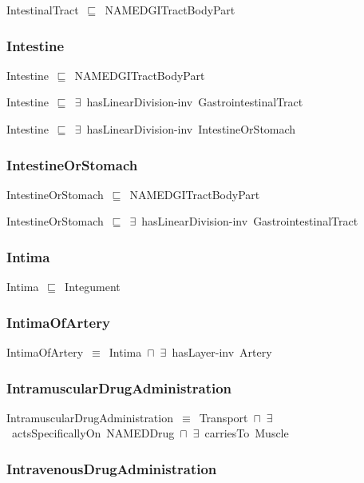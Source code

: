 \documentclass{article}
\begin{document}
IntestinalTract~\ensuremath{\sqsubseteq}~NAMEDGITractBodyPart~

\subsubsection*{Intestine}

Intestine~\ensuremath{\sqsubseteq}~NAMEDGITractBodyPart~

Intestine~\ensuremath{\sqsubseteq}~\ensuremath{\exists}~hasLinearDivision-inv~GastrointestinalTract~

Intestine~\ensuremath{\sqsubseteq}~\ensuremath{\exists}~hasLinearDivision-inv~IntestineOrStomach~

\subsubsection*{IntestineOrStomach}

IntestineOrStomach~\ensuremath{\sqsubseteq}~NAMEDGITractBodyPart~

IntestineOrStomach~\ensuremath{\sqsubseteq}~\ensuremath{\exists}~hasLinearDivision-inv~GastrointestinalTract~

\subsubsection*{Intima}

Intima~\ensuremath{\sqsubseteq}~Integument~

\subsubsection*{IntimaOfArtery}

IntimaOfArtery~\ensuremath{\equiv}~Intima~\ensuremath{\sqcap}~\ensuremath{\exists}~hasLayer-inv~Artery

\subsubsection*{IntramuscularDrugAdministration}

IntramuscularDrugAdministration~\ensuremath{\equiv}~Transport~\ensuremath{\sqcap}~\ensuremath{\exists}~actsSpecificallyOn~NAMEDDrug~\ensuremath{\sqcap}~\ensuremath{\exists}~carriesTo~Muscle

\subsubsection*{IntravenousDrugAdministration}
\end{document}
